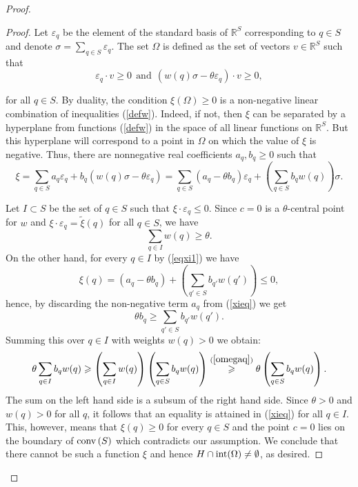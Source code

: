 \documentclass[10pt,a4paper]{amsart}
\newcommand{\R}{\mathbb R}
\newcommand{\conv}{{\rm conv}\,}
\renewcommand{\ge}{\geqslant}
\renewcommand{\le}{\leqslant}
\begin{document}
\begin{proof}
\begin{proof}
Let $\varepsilon_q$ be the element of the standard basis of $\R^S$ corresponding to $q \in S$ and denote $\sigma = \sum_{q \in S}\varepsilon_q$. The set $\Omega$ is defined as the set of vectors $v \in \R^S$ such that
\begin{equation} \label{defw}
\varepsilon_q \cdot v \ge 0~~ \text{and} ~~(w(q)\sigma - \theta \varepsilon_q) \cdot v \ge 0,
\end{equation}

for all $q \in S$. By duality, the condition $\xi(\Omega) \ge 0$ is a non-negative linear combination of inequalities (\ref{defw}).
Indeed, if not, then $\xi$ can be separated by a hyperplane from functions (\ref{defw}) in the space of all linear functions on $\R^S$. But this hyperplane will correspond to a point in $\Omega$ on which the value of $\xi$ is negative.
Thus, there are nonnegative real coefficients $a_q, b_q \ge 0$ such that
\begin{equation}\label{eqxi1}
    \xi = \sum_{q \in S} a_q \varepsilon_q + b_q (w(q)\sigma - \theta \varepsilon_q) = \sum_{q \in S} (a_q - \theta b_q)\varepsilon_q + \left( \sum_{q \in S} b_q w(q) \right) \sigma.
\end{equation}

Let $I \subset S$ be the set of $q \in S$ such that $\xi \cdot \varepsilon_q \le 0$. Since $c= 0$ is a $\theta$-central point for $w$ and $\xi\cdot \varepsilon_q = \tilde \xi(q)$ for all $q \in S$, we have 
\begin{equation}\label{omegaq}
\sum_{q \in I} w(q) \ge \theta. 
\end{equation}
On the other hand, for every $q \in I$ by (\ref{eqxi1}) we have
\begin{equation}\label{xieq}
\xi(q) = (a_q - \theta b_q) + \left(\sum_{q' \in S} b_{q'} w(q') \right) \le 0,
\end{equation}
hence, by discarding the non-negative term $a_q$ from (\ref{xieq}) we get
$$
\theta b_q \ge \sum_{q' \in S} b_{q'} w(q').
$$
Summing this over $q \in I$ with weights $w(q)>0$ we obtain:
$$
\theta \sum_{q \in I} b_q w(q) \ge \left( \sum_{q \in I} w(q) \right) \left( \sum_{q \in S} b_{q} w(q)  \right) \stackrel{(\ref{omegaq})}{\ge} \theta \left( \sum_{q \in S} b_{q} w(q)  \right).
$$
The sum on the left hand side is a subsum of the right hand side. Since $\theta > 0$ and $w(q) > 0$ for all $q$, it follows that an equality is attained in (\ref{xieq}) for all $q \in I$. This, however, means that $\xi(q) \ge 0$ for every $q\in S$ and the point $c = 0$ lies on the boundary of $\conv(S)$ which contradicts our assumption.
We conclude that there cannot be such a function $\xi$ and hence $H \cap {\rm int}(\Omega) \neq \emptyset$, as desired.
\end{proof}


\end{proof}
\end{document}
